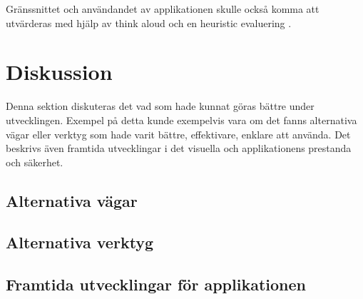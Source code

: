 \documentclass[a4paper, 11pt]{article}
\begin{document}
Gränssnittet och användandet av applikationen skulle också komma att utvärderas med hjälp av think aloud \cite{thinkaloud} och en heuristic evaluering \cite{heruistic}.

\section{Diskussion}
Denna sektion diskuteras det vad som hade kunnat göras bättre under utvecklingen. Exempel på detta kunde exempelvis vara om det fanns alternativa vägar eller verktyg som hade varit bättre, effektivare, enklare att använda. Det beskrivs även framtida utvecklingar i det visuella och applikationens prestanda och säkerhet.

\subsection{Alternativa vägar}

\subsection{Alternativa verktyg}

\subsection{Framtida utvecklingar för applikationen}



\newpage
\printbibliography[title={Referenser}]
\end{document}
